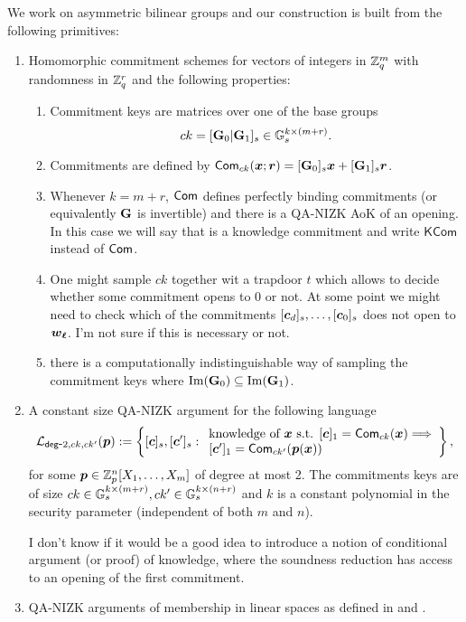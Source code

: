 We work on asymmetric bilinear groups and our construction is built from the following primitives:
\begin{enumerate}
\item Homomorphic commitment schemes for vectors of integers in $\mathbb{Z}_q^m$ with randomness in $\mathbb{Z}_q^r$ and the following properties:
\begin{enumerate}
	\item Commitment keys are matrices over one of the base groups $$ck=[\mathbf{{G}}_0|\mathbf{{G}}_1]_s\in\mathbb{G}_s^{k\times(m+r)}.$$
	\item Commitments are defined by $\mathsf{Com}_{ck}({\boldsymbol{x}};{\boldsymbol{r}})=[\mathbf{{G}}_0]_s{\boldsymbol{x}}+[\mathbf{{G}}_1]_s{\boldsymbol{r}}$.		\item Whenever $k=m+r$, $\mathsf{Com}$ defines perfectly binding commitments (or equivalently $\mathbf{{G}}$ is invertible) and 	                   there is a QA-NIZK AoK of an opening. In this case we will say that is a knowledge commitment and write $\mathsf{KCom}$ instead of $\mathsf{Com}$.
\item One might sample $ck$ together wit a trapdoor $t$ which allows to decide whether some commitment opens to $0$ or not. {\color{red} At some point we might need to check which of the commitments $[{\boldsymbol{c}}_d]_s,\ldots,[{\boldsymbol{c}}_0]_s$ does not open to ${\boldsymbol{{\boldsymbol{w}}_\ell}}$.  I'm not sure if this is necessary or not.}
	\item there is a computationally indistinguishable way of sampling the commitment keys where $\mathrm{Im}(\mathbf{{G}}_0)\subseteq\mathrm{Im}\mathrm(\mathbf{{G}}_1)$. 
\end{enumerate}
\item A constant size QA-NIZK argument for the following language
$$
\mathcal{L}_{\mathsf{deg}\mbox{-}2,ck,ck'}({\boldsymbol{p}}):=\left\{[{\boldsymbol{c}}]_s,[{\boldsymbol{c}}']_s:
\begin{array}{l}
		\text{knowledge of } {\boldsymbol{x}} \text{ s.t. }
		{[{\boldsymbol{c}}]_1=\mathsf{Com}_{ck}({\boldsymbol{x}})}
		\Longrightarrow\\
		{[{\boldsymbol{c}}']_1=\mathsf{Com}_{ck'}({\boldsymbol{p}}({\boldsymbol{x}}))}
	\end{array}\right\},
$$
for some ${\boldsymbol{p}}\in\mathbb{Z}_p^n[X_1,\ldots,X_m]$ of degree at most 2. The commitments keys are of size $ck\in\mathbb{G}_s^{k\times(m+r)},ck'\in\mathbb{G}_s^{k\times(n+r)}$ and $k$ is a constant polynomial in the security parameter (independent of both $m$ and $n$).


{\color{red} I don't know if it would be a good idea to introduce a notion of conditional argument (or proof) of knowledge, where the soundness reduction has access to an opening of the first commitment.}
\item QA-NIZK arguments of membership in linear spaces as defined in \cite{EC:KilWee15} and \cite{AC:GonHevRaf15}.
\end{enumerate}

